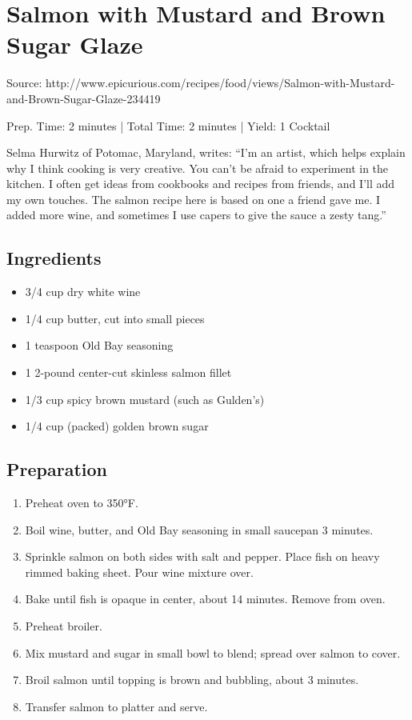 \section{Salmon with Mustard and Brown Sugar Glaze}

Source: http://www.epicurious.com/recipes/food/views/Salmon-with-Mustard-and-Brown-Sugar-Glaze-234419

\begin{center}
Prep. Time: 2 minutes |
Total Time: 2 minutes | 
Yield: 1 Cocktail

\vspace{1em}

Selma Hurwitz of Potomac, Maryland, writes: ``I'm an artist, which helps explain why I think cooking is very creative. You can't be afraid to experiment in the kitchen. I often get ideas from cookbooks and recipes from friends, and I'll add my own touches. The salmon recipe here is based on one a friend gave me. I added more wine, and sometimes I use capers to give the sauce a zesty tang.''
\end{center}

\subsection{Ingredients}
\begin{multicols}{2}
\begin{itemize}
    \item 3/4 cup dry white wine
    \item 1/4 cup butter, cut into small pieces
    \item 1 teaspoon Old Bay seasoning
    \item 1 2-pound center-cut skinless salmon fillet
    \item 1/3 cup spicy brown mustard (such as Gulden's)
    \item 1/4 cup (packed) golden brown sugar
\end{itemize}
\end{multicols}

\subsection{Preparation}
\begin{enumerate}
    \item Preheat oven to 350°F.
    \item Boil wine, butter, and Old Bay seasoning in small saucepan 3 minutes.
    \item Sprinkle salmon on both sides with salt and pepper. Place fish on heavy rimmed baking sheet. Pour wine mixture over.
    \item Bake until fish is opaque in center, about 14 minutes. Remove from oven.
    \item Preheat broiler.
    \item Mix mustard and sugar in small bowl to blend; spread over salmon to cover.
    \item Broil salmon until topping is brown and bubbling, about 3 minutes.
    \item Transfer salmon to platter and serve.
\end{enumerate}


